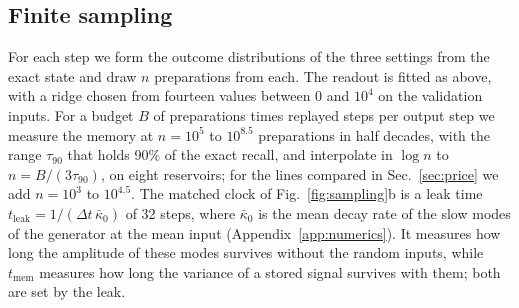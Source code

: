 \subsection{Finite sampling}
\label{sec:methods-sampling}
For each step we form the outcome distributions of the three settings from the exact state and draw $n$ preparations
from each. The readout is fitted as above, with a ridge chosen from fourteen values between 0 and $10^4$ on the
validation inputs. For a budget $B$ of preparations times replayed steps per output step we measure the memory at
$n=10^5$ to $10^{8.5}$ preparations in half decades, with the range $\tau_{90}$ that holds 90\% of the exact recall,
and interpolate in $\log n$ to $n=B/(3\tau_{90})$, on eight reservoirs; for the lines compared in
Sec.~\ref{sec:price} we add $n=10^3$ to $10^{4.5}$. The matched clock of Fig.~\ref{fig:sampling}b is a leak time
$t_{\mathrm{leak}}=1/(\Delta t\,\bar\kappa_0)$ of 32 steps, where $\bar\kappa_0$ is the mean decay rate of the slow
modes of the generator at the mean input (Appendix~\ref{app:numerics}). It measures how long the amplitude of these
modes survives without the random inputs, while $t_{\mathrm{mem}}$ measures how long the variance of a stored signal
survives with them; both are set by the leak.
